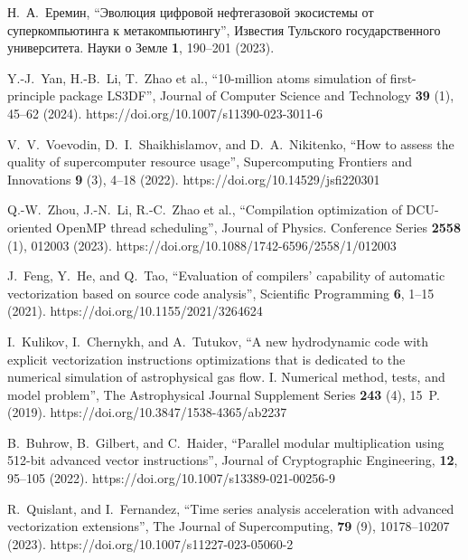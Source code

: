 \documentclass[
11pt,%
tightenlines,%
twoside,%
onecolumn,%
nofloats,%
nobibnotes,%
nofootinbib,%
superscriptaddress,%
noshowpacs,%
centertags]%
{revtex4}
\begin{document}
\begin{thebibliography}{99}
Н.~А.~Еремин, \textquotedblleft Эволюция цифровой нефтегазовой экосистемы от суперкомпьютинга к метакомпьютингу\textquotedblright, Известия Тульского государственного университета. Науки о Земле \textbf{1}, 190--201 (2023).

Y.-J.~Yan, H.-B.~Li, T.~Zhao et al., \textquotedblleft 10-million atoms simulation of first-principle package LS3DF\textquotedblright, Journal of Computer Science and Technology \textbf{39} (1), 45--62 (2024). https://doi.org/10.1007/s11390-023-3011-6

V.~V.~Voevodin, D.~I.~Shaikhislamov, and D.~A.~Nikitenko, \textquotedblleft How to assess the quality of supercomputer resource usage\textquotedblright, Supercomputing Frontiers and Innovations \textbf{9} (3), 4--18 (2022). https://doi.org/10.14529/jsfi220301

Q.-W.~Zhou, J.-N.~Li, R.-C.~Zhao et al., \textquotedblleft Compilation optimization of DCU-oriented OpenMP thread scheduling\textquotedblright, Journal of Physics. Conference Series \textbf{2558} (1), 012003 (2023). https://doi.org/10.1088/1742-6596/2558/1/012003

J.~Feng, Y.~He, and Q.~Tao, \textquotedblleft Evaluation of compilers’ capability of automatic vectorization based on source code analysis\textquotedblright, Scientific Programming \textbf{6}, 1--15 (2021). https://doi.org/10.1155/2021/3264624


I.~Kulikov, I.~Chernykh, and A.~Tutukov, \textquotedblleft A new hydrodynamic code with explicit vectorization instructions optimizations that is dedicated to the numerical simulation of astrophysical gas flow. I. Numerical method, tests, and model problem\textquotedblright, The Astrophysical Journal Supplement Series \textbf{243} (4), 15~P. (2019). https://doi.org/10.3847/1538-4365/ab2237

B.~Buhrow, B.~Gilbert, and C.~Haider, \textquotedblleft Parallel modular multiplication using 512-bit advanced vector instructions\textquotedblright, Journal of Cryptographic Engineering, \textbf{12}, 95--105 (2022). https://doi.org/10.1007/s13389-021-00256-9

R.~Quislant, and I.~Fernandez, \textquotedblleft Time series analysis acceleration with advanced vectorization extensions\textquotedblright, The Journal of Supercomputing, \textbf{79} (9), 10178--10207 (2023). https://doi.org/10.1007/s11227-023-05060-2


\end{thebibliography}
\end{document}
